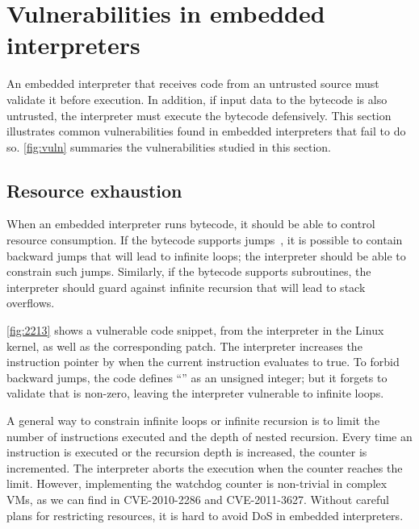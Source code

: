 \section{Vulnerabilities in embedded interpreters}
\label{s:vuln}



An embedded interpreter that receives code from an untrusted source must validate
it before execution.  In addition, if input data to the bytecode is also
untrusted, the interpreter must execute the bytecode defensively.
This section illustrates common vulnerabilities found in embedded interpreters
that fail to do so. \autoref{fig:vuln} summaries the
vulnerabilities studied in this section.

\subsection{Resource exhaustion}
\label{s:vuln:loop}

When an embedded interpreter runs bytecode,
it should be able to control resource consumption.
If the bytecode supports jumps~\cite{aml:spec,rar:vm,clamav:llvm},
it is possible to contain backward jumps that will lead to
infinite loops;
the interpreter should be able to constrain such jumps.
Similarly, if the bytecode supports subroutines,
the interpreter should guard against infinite recursion that will lead
to stack overflows.

\autoref{fig:2213} shows a vulnerable code snippet, from the
\inetdiag interpreter in the Linux kernel,
as well as the corresponding patch.  The interpreter
increases the instruction pointer by  when the
current instruction evaluates to true.
%
To forbid backward jumps, the code defines ``'' as an
unsigned integer; but it forgets to validate that 
is non-zero, leaving the interpreter vulnerable to infinite loops.

A general way to constrain infinite loops or infinite recursion is to limit the
number of instructions executed and the depth of nested recursion.  Every time an
instruction is executed or the recursion depth is increased, the counter is
incremented. The interpreter aborts the execution when the counter reaches the
limit. However, implementing the watchdog counter is non-trivial in complex VMs,
as we can find in CVE-2010-2286 and CVE-2011-3627. Without careful plans for
restricting resources, it is hard to avoid DoS in embedded interpreters.

